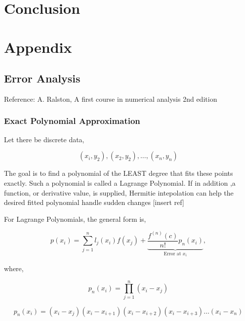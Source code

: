 \documentclass[12pt]{article}
\begin{document}
\section{Conclusion}

\section{Appendix}

\subsection{Error Analysis}

Reference: A. Ralston, A first course in numerical analysis 2nd edition

\subsubsection{Exact Polynomial Approximation}

Let there be discrete data,

\begin{equation*}
    \left( x_{i},y_2 \right),\left( x_2, y_2 \right), \dots , \left( x_n,y_n \right)
\end{equation*}

The goal is to find a polynomial of the LEAST degree that fits these points
exactly.  Such a polynomial is called a Lagrange Polynomial. If in addition ,a
function, or derivative value, is supplied, Hermitie intepolation can help the 
desired fitted polynomial handle sudden changes [insert ref]

For Lagrange Polynomials, the general form is,

\begin{equation*}
    p\left( x_i  \right) =
    \sum_{j=1}^{n} l_j(x_i) f(x_j) + \underbrace{\frac{f^{(n)}\left( c \right)}
    {n!}p_n(x_i)}_{\text{Error at } x_i},
\end{equation*}

where,

\begin{equation*}
    p_n(x_i) = \prod_{j = 1}^{n} \left( x_i - x_j \right) 
\end{equation*}

\begin{equation*}
    p_n(x_i) =  \left( x_{i} - x_{j} \right) 
    \left( x_i - x_{i+1} \right)
    \left( x_i - x_{i+2} \right)
    \left( x_i - x_{i+3} \right) \dots
    ( x_i - x_n)
\end{equation*}
\end{document}
